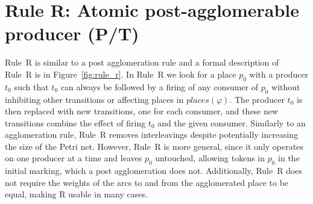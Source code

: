 \section*{Rule R: Atomic post-agglomerable producer (P/T)}\label{sec:rule_r}
Rule~R is similar to a post agglomeration rule and a formal description of Rule~R is in Figure~\ref{fig:rule_r}.
In Rule~R we look for a place $p_0$ with a producer $t_0$ such that $t_0$ can always be followed by
a firing of any consumer of $p_0$ without inhibiting other transitions or affecting places in $places(\varphi)$.
The producer $t_0$ is then replaced with new transitions, one for each consumer, and these new transitions
combine the effect of firing $t_0$ and the given consumer.
Similarly to an agglomeration rule, Rule~R removes interleavings despite potentially increasing the size of the Petri net.
However, Rule~R is more general, since it only operates on one producer at a time and leaves $p_0$ untouched,
allowing tokens in $p_0$ in the initial marking, which a post agglomeration does not.
Additionally, Rule~R does not require the weights of the arcs to and from the agglomerated place to be equal,
making R usable in many cases.

